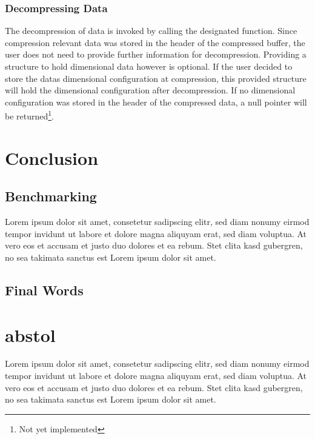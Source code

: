 \documentclass[
	12pt,
	a4paper,
	BCOR10mm,
	DIV14,
	headsepline,
]{scrreprt}
\begin{document}
\clearpage

\subsection{Decompressing Data}

\bigskip

The decompression of data is invoked by calling the designated function. Since
compression relevant data was stored in the header of the compressed buffer, the
user does not need to provide further information for decompression. Providing a
structure to hold dimensional data however is optional. If the user decided to
store the datas dimensional configuration at compression, this provided
structure will hold the dimensional configuration after decompression. If no
dimensional configuration was stored in the header of the compressed data, a
null pointer will be returned\footnote{Not yet implemented}.

\setcounter{footnote}{0}

\chapter{Conclusion}
\label{Conclusion}

\section{Benchmarking}
Lorem ipsum dolor sit amet, consetetur sadipscing elitr, sed diam nonumy eirmod tempor invidunt ut labore et dolore magna aliquyam erat, sed diam voluptua.
At vero eos et accusam et justo duo dolores et ea rebum.
Stet clita kasd gubergren, no sea takimata sanctus est Lorem ipsum dolor sit amet.

\section{Final Words}




\appendix
\appendixpage

\chapter{abstol}
\label{abstol}

Lorem ipsum dolor sit amet, consetetur sadipscing elitr, sed diam nonumy eirmod tempor invidunt ut labore et dolore magna aliquyam erat, sed diam voluptua.
At vero eos et accusam et justo duo dolores et ea rebum.
Stet clita kasd gubergren, no sea takimata sanctus est Lorem ipsum dolor sit amet.
\end{document}
